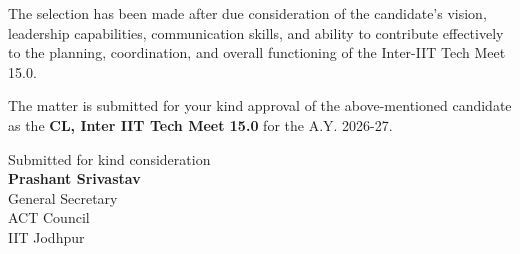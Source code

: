\documentclass[11pt,letterpaper]{article}
\newcommand{\GSname}{Prashant Srivastav}
\begin{document}
The selection has been made after due consideration of the candidate's vision, leadership capabilities, communication skills, and ability to contribute effectively to the planning, coordination, and overall functioning of the Inter-IIT Tech Meet 15.0.

The matter is submitted for your kind approval of the above-mentioned candidate as the \textbf{CL, Inter IIT Tech Meet 15.0} for the A.Y. 2026-27.


\begin{flushright}
  {\small Submitted for kind consideration}\\[1.2cm]
  {\large\bfseries \GSname}\\
  General Secretary\\
  ACT Council\\
  IIT Jodhpur
\end{flushright}
\end{document}
